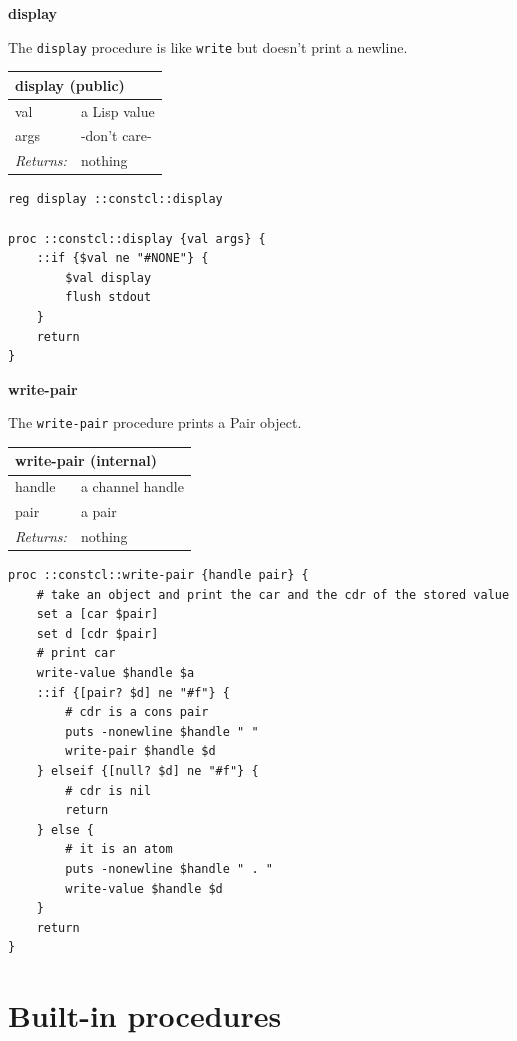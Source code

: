 \documentclass[twoside,9pt]{report}
\begin{document}
\textbf{display}


The \texttt{display} procedure is like \texttt{write} but doesn't print a newline.

\begin{tabular}{ |l l| }
\hline
\multicolumn{2}{|l|}{display (public)} \\
\hline
val & a Lisp value \\
args & -don't care- \\
\textit{Returns:} & nothing \\
\hline
\end{tabular}

\noindent\makebox[\linewidth]{\rule{\linewidth}{0.4pt}}
\begin{lstlisting}
reg display ::constcl::display
 
proc ::constcl::display {val args} {
    ::if {$val ne "#NONE"} {
        $val display
        flush stdout
    }
    return
}
\end{lstlisting}
\noindent\makebox[\linewidth]{\rule{\linewidth}{0.4pt}}

\textbf{write-pair}


The \texttt{write-pair} procedure prints a Pair object.

\begin{tabular}{ |l l| }
\hline
\multicolumn{2}{|l|}{write-pair (internal)} \\
\hline
handle & a channel handle \\
pair & a pair \\
\textit{Returns:} & nothing \\
\hline
\end{tabular}

\noindent\makebox[\linewidth]{\rule{\linewidth}{0.4pt}}
\begin{lstlisting}
proc ::constcl::write-pair {handle pair} {
    # take an object and print the car and the cdr of the stored value
    set a [car $pair]
    set d [cdr $pair]
    # print car
    write-value $handle $a
    ::if {[pair? $d] ne "#f"} {
        # cdr is a cons pair
        puts -nonewline $handle " "
        write-pair $handle $d
    } elseif {[null? $d] ne "#f"} {
        # cdr is nil
        return
    } else {
        # it is an atom
        puts -nonewline $handle " . "
        write-value $handle $d
    }
    return
}
\end{lstlisting}
\noindent\makebox[\linewidth]{\rule{\linewidth}{0.4pt}}
\section{Built-in procedures}
\label{built-in-procedures}
\end{document}
